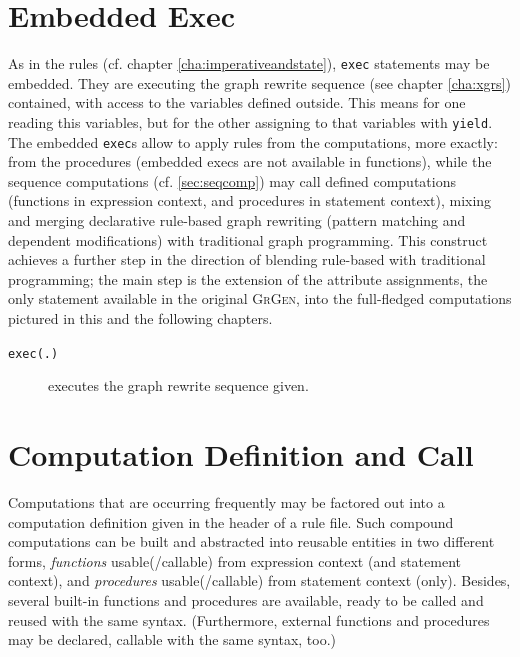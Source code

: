 \section{Embedded Exec} 

As in the rules (cf. chapter \ref{cha:imperativeandstate}), \texttt{exec} statements may be embedded.
They are executing the graph rewrite sequence (see chapter \ref{cha:xgrs}) contained, with access to the variables defined outside.
This means for one reading this variables, but for the other assigning to that variables with \texttt{yield}.
The embedded \texttt{exec}s allow to apply rules from the computations, more exactly: from the procedures (embedded execs are not available in functions), while the sequence computations (cf. \ref{sec:seqcomp}) may call defined computations (functions in expression context, and procedures in statement context), mixing and merging declarative rule-based graph rewriting (pattern matching and dependent modifications) with traditional graph programming.
This construct achieves a further step in the direction of blending rule-based with traditional programming; the main step is the extension of the attribute assignments, the only statement available in the original {\scshape GrGen}, into the full-fledged computations pictured in this and the following chapters.

\begin{description}
\item[\texttt{exec(.)}] executes the graph rewrite sequence given. 
\end{description}



\section{Computation Definition and Call} \label{sub:compdef}

Computations that are occurring frequently may be factored out into a computation definition given in the header of a rule file.
Such compound computations can be built and abstracted into reusable entities in two different forms, \emph{functions} usable(/callable) from expression context (and statement context), and \emph{procedures} usable(/callable) from statement context (only).
Besides, several built-in functions and procedures are available, ready to be called and reused with the same syntax.
(Furthermore, external functions and procedures may be declared, callable with the same syntax, too.)

